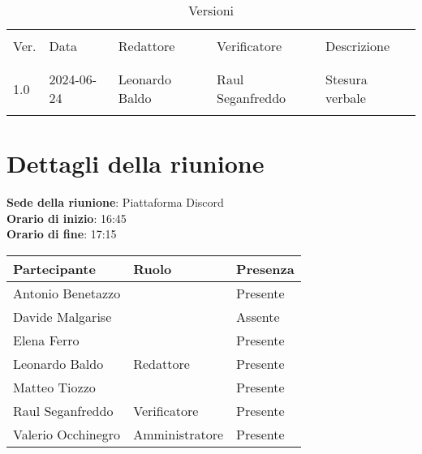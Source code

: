 \documentclass[italian,12pt]{article}
\begin{document}
\newcommand{\mySkip}[1][]{#1}



\newpage



\begin{table}[!h]
	\caption{Versioni}
	\footnotesize
	\begin{center}
		\begin{tabular}{ l l l l p{6cm} }
			\hline                                                                      \\[-2ex]
			Ver. & Data       & Redattore        & Verificatore       & Descrizione     \\
			\\[-2ex] \hline \\[-1.5ex]
			1.0  & 2024-06-24 & Leonardo Baldo   & Raul Seganfreddo   & Stesura verbale \\
			\\[-1.5ex] \hline
		\end{tabular}
	\end{center}
\end{table}

\newpage

\tableofcontents

\newpage

\section{Dettagli della riunione}

\textbf{Sede della riunione}: Piattaforma Discord\\
\textbf{Orario di inizio}: 16:45\\
\textbf{Orario di fine}: 17:15\\

\begin{flushleft}
	\begin{table}[!h]
		\begin{tabular}{ |l|l|l| }
			\hline
			\textbf{Partecipante} & \textbf{Ruolo} & \textbf{Presenza} \\
			\hline
			Antonio Benetazzo     &                & Presente          \\
			Davide Malgarise      &                & Assente           \\
			Elena Ferro           &                & Presente          \\
			Leonardo Baldo        & Redattore      & Presente          \\
			Matteo Tiozzo         &                & Presente          \\
			Raul Seganfreddo      & Verificatore   & Presente          \\
			Valerio Occhinegro    & Amministratore & Presente          \\
			\hline
		\end{tabular}
	\end{table}
\end{flushleft}
\end{document}
